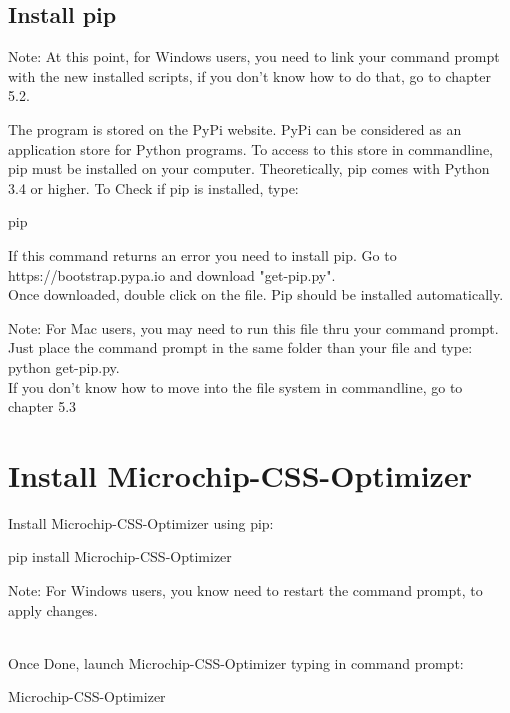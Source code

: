 \documentclass[10pt,letterpaper]{article}
\begin{document}
\subsection {Install pip}
\begin{itshape}
Note: At this point, for Windows users, you need to link your command prompt with the new installed scripts, if you don't know how to do that, go to chapter 5.2.
\end{itshape}
 \medbreak
The program is stored on the PyPi website. PyPi can be considered as an application store for Python programs. To access to this store in commandline, pip must be installed on your computer.
Theoretically, pip comes with Python 3.4 or higher. To Check if pip is installed, type:
\begin{mdframed}[backgroundcolor=black, fontcolor=white]
pip
\end{mdframed} 
If this command returns an error you need to install pip. Go to https://bootstrap.pypa.io and download "get-pip.py".\\
Once downloaded, double click on the file. Pip should be installed automatically.
\begin{itshape}
 \medbreak
Note: For Mac users, you may need to run this file thru your command prompt. Just place the command prompt in the same folder than your file and type:\\ 
python get-pip.py.\\
If you don't know how to move into the file system in commandline, go to chapter 5.3
\end{itshape}
 \medbreak

\section {Install Microchip-CSS-Optimizer}

Install Microchip-CSS-Optimizer using pip:\\
\begin{mdframed}[backgroundcolor=black, fontcolor=white]
pip install Microchip-CSS-Optimizer
\end{mdframed}
\begin{itshape}
Note: For Windows users, you know need to restart the command prompt, to apply changes.\\
\end{itshape}
\\Once Done, launch Microchip-CSS-Optimizer typing in command prompt:
\begin{mdframed}[backgroundcolor=black, fontcolor=white]
Microchip-CSS-Optimizer
\end{mdframed}
\newpage
\end{document}

